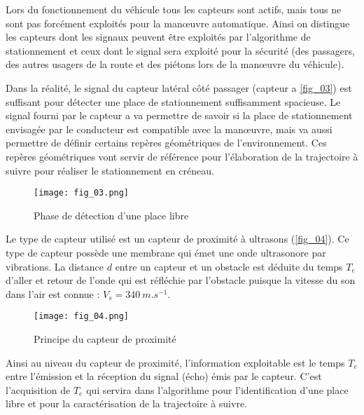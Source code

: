 Lors du fonctionnement du véhicule tous les capteurs sont actifs, mais tous ne sont pas forcément exploités
pour la manœuvre automatique. Ainsi on distingue les capteurs dont les signaux peuvent être exploités par
l’algorithme de stationnement et ceux dont le signal sera exploité pour la sécurité (des passagers, des autres
usagers de la route et des piétons lors de la manœuvre du véhicule).


Dans la réalité, le signal du capteur latéral côté passager (capteur a \autoref{fig_03}) est suffisant pour détecter une
place de stationnement suffisamment spacieuse. Le signal fourni par le capteur a va permettre de savoir si la
place de stationnement envisagée par le conducteur est compatible avec la manœuvre, mais va aussi permettre
de définir certains repères géométriques de l’environnement. Ces repères géométriques vont servir de référence
pour l’élaboration de la trajectoire à suivre pour réaliser le stationnement en créneau.


\begin{figure}[H]
\centering
\texttt{[image: fig\_03.png]}
\caption{Phase de détection d’une place libre \label{fig_03}}
\end{figure}

Le type de capteur utilisé est un capteur de proximité à ultrasons (\autoref{fig_04}). Ce type de capteur possède une
membrane qui émet une onde ultrasonore par vibrations. La distance $d$ entre un capteur et un obstacle est
déduite du temps $T_e$ d’aller et retour de l’onde qui est réfléchie par l’obstacle puisque la vitesse du son dans
l’air est connue : $V_s = \SI{340}{m.s^{-1}}$.

\begin{figure}[H]
\centering
\texttt{[image: fig\_04.png]}
\caption{Principe du capteur de proximité \label{fig_04}}
\end{figure}

Ainsi au niveau du capteur de proximité, l’information exploitable est le temps $T_e$
entre l’émission et la réception
du signal (écho) émis par le capteur. C’est l’acquisition de $T_e$ qui servira dans l’algorithme pour l’identification
d’une place libre et pour la caractérisation de la trajectoire à suivre.

